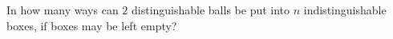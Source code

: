 In how many ways can $2$ distinguishable balls be put into $n$ indistinguishable boxes, if boxes may be left empty?
